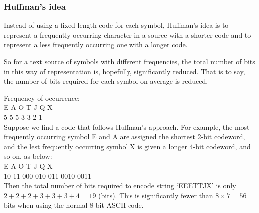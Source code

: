 \begin{frame}
\frametitle{Huffman’s idea}
Instead of using a fixed-length code for each symbol, Huffman’s idea is to
represent a frequently occurring character in a source with a shorter code and
to represent a less frequently occurring one with a longer code. 

So for a text
source of symbols with different frequencies, the total number of bits in this
way of representation is, hopefully, significantly reduced. That is to say, the
number of bits required for each symbol on average is reduced.
\end{frame}
\begin{frame}
Frequency of occurrence:\\
E A O T J Q X\\
5 5 5 3 3 2 1\\
Suppose we find a code that follows Huffman’s approach. For example, the
most frequently occurring symbol E and A are assigned the shortest 2-bit
codeword, and the lest frequently occurring symbol X is given a longer 4-bit
codeword, and so on, as below:\\
E A O T J Q X\\
10 11 000 010 011 0010 0011\\
Then the total number of bits required to encode string `EEETTJX’ is only
$2 + 2 + 2 + 3 + 3 + 3 + 4 = 19$ (bits). This is significantly fewer than
$8 \times 7 = 56$ bits when using the normal 8-bit ASCII code.
\end{frame}

